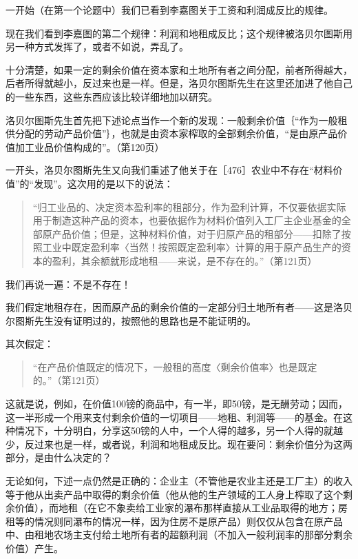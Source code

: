 一开始（在第一个论题中）我们已看到李嘉图关于工资和利润成反比的规律。

现在我们看到李嘉图的第二个规律：利润和地租成反比；这个规律被洛贝尔图斯用另一种方式发挥了，或者不如说，弄乱了。

十分清楚，如果一定的剩余价值在资本家和土地所有者之间分配，前者所得越大，后者所得就越小，反过来也是一样。但是，洛贝尔图斯先生在这里还加进了他自己的一些东西，这些东西应该比较详细地加以研究。

洛贝尔图斯先生首先把下述论点当作一个新的发现：一般剩余价值｛“作为一般租供分配的劳动产品价值”｝，也就是由资本家榨取的全部剩余价值，“是由原产品价值加工业品价值构成的”。（第120页）

一开头，洛贝尔图斯先生又向我们重述了他关于在［476］农业中不存在“材料价值”的“发现”。这次用的是以下的说法：

\begin{quote}{“归工业品的、决定资本盈利率的租部分，作为盈利计算，不仅要依据实际用于制造这种产品的资本，也要依据作为材料价值列入工厂主企业基金的全部原产品价值；但是，这种材料价值，对于归原产品的租部分——扣除了按照工业中既定盈利率〈当然！按照既定盈利率〉计算的用于原产品生产的资本的盈利，其余额就形成地租——来说，是不存在的。”（第121页）}\end{quote}

我们再说一遍：不是不存在！

我们假定地租存在，因而原产品的剩余价值的一定部分归土地所有者——这是洛贝尔图斯先生没有证明过的，按照他的思路也是不能证明的。

其次假定：

\begin{quote}{“在产品价值既定的情况下，一般租的高度〈剩余价值率〉也是既定的。”（第121页）}\end{quote}

这就是说，例如，在价值100镑的商品中，有一半，即50镑，是无酬劳动；因而，这一半形成一个用来支付剩余价值的一切项目——地租、利润等——的基金。在这种情况下，十分明白，分享这50镑的人中，一个人得的越多，另一个人得的就越少，反过来也是一样，或者说，利润和地租成反比。现在要问：剩余价值分为这两部分，是由什么决定的？

无论如何，下述一点仍然是正确的：企业主（不管他是农业主还是工厂主）的收入等于他从出卖产品中取得的剩余价值（他从他的生产领域的工人身上榨取了这个剩余价值），而地租（在它不象卖给工业家的瀑布那样直接从工业品取得的地方；房租等的情况则同瀑布的情况一样，因为住房不是原产品）则仅仅从包含在原产品中、由租地农场主支付给土地所有者的超额利润（不加入一般利润率的那部分剩余价值）产生。

